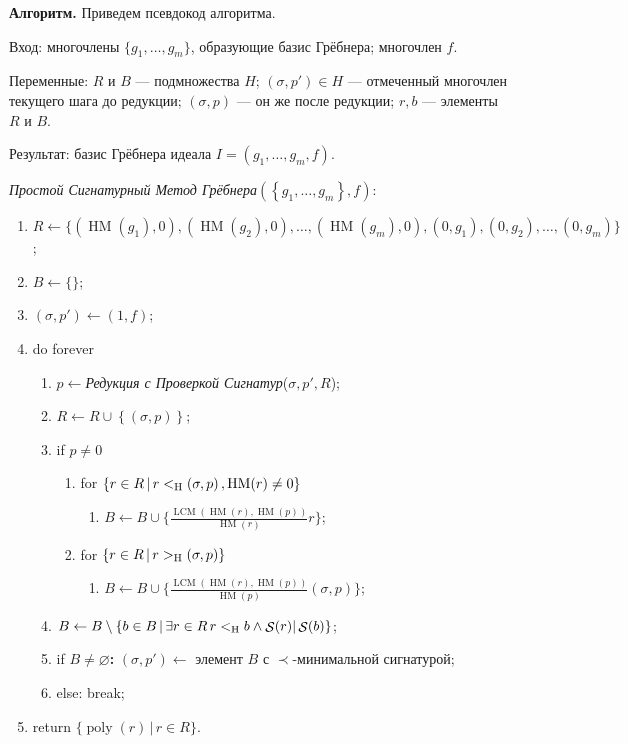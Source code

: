 \documentclass[russian,11pt,twoside]{article}
\DeclareMathOperator{\HM}{HM}
\DeclareMathOperator{\LCM}{LCM}
\DeclareMathOperator{\poly}{poly}
\DeclareMathOperator{\SIG}{\mathcal{S}}
\begin{document}
\textbf{Алгоритм. }Приведем псевдокод алгоритма.

Вход: многочлены $\{g_{1},\dots,g_{m}\}$, образующие базис Грёбнера;
многочлен $f$.

Переменные: $R$ и $B$ --- подмножества $H$; $(\sigma,p')\in H$
--- отмеченный многочлен текущего шага до редукции; $(\sigma,p)$
--- он же после редукции; $r,b$ --- элементы $R$ и $B$.

Результат: базис Грёбнера идеала $I=\left(g_{1},\dots,g_{m},f\right)$.

\medskip{}


\emph{Простой Сигнатурный Метод Грёбнера}$\left(\left\{ g_{1},\dots,g_{m}\right\} ,f\right)$:
\begin{enumerate}[label=\arabic{enumi})]
\item $R\leftarrow\{\left(\HM(g_{1}),0\right),\left(\HM(g_{2}),0\right),\dots,\left(\HM(g_{m}),0\right),(0,g_{1}),(0,g_{2}),\dots,(0,g_{m})\}$;
\item $B\leftarrow\{\}$;
\item $(\sigma,p')\leftarrow(1,f)$;
\item do forever

\begin{enumerate}[label=\alph{enumii}),ref=\arabic{enumi}\alph{enumii}]
\item \label{enu:-before-reduce}$p\leftarrow$\emph{Редукция с Проверкой
Сигнатур}($\sigma,p',R$);
\item \label{enu:-after-reduce}$R\leftarrow R\cup\left\{ \left(\sigma,p\right)\right\} $;
\item if\textbf{ }$p\not=0$

\begin{enumerate}[label=\roman{enumiii})]
\item for $\{r\in R\,|\, r\GVWl\left(\sigma,p\right),\HM(r)\neq0\}$

\begin{enumerate}[label=]
\item $B\leftarrow B\cup\{\frac{\LCM(\HM(r),\HM(p))}{\HM(r)}r\}$;
\end{enumerate}
\item for $\{r\in R\,|\, r>_{\text{\textnormal{H}}}\left(\sigma,p\right)\}$

\begin{enumerate}[label=]
\item $B\leftarrow B\cup\{\frac{\LCM(\HM(r),\HM(p))}{\HM(p)}\left(\sigma,p\right)\}$;
\end{enumerate}
\end{enumerate}
\item \label{enu:-remove-from-B}$B\leftarrow B\setminus\{b\in B\,|\,\exists r\in R\, r\GVWl b\wedge\SIG(r)|\SIG(b)\}$;
\item if \textbf{$B\neq\varnothing$: }$(\sigma,p')\leftarrow$ элемент
$B$ с $\prec$-минимальной сигнатурой;
\item else: break;
\end{enumerate}
\item return\textbf{ }$\{\poly(r)\,|\, r\in R\}$.
\end{enumerate}
\medskip{}
\end{document}
